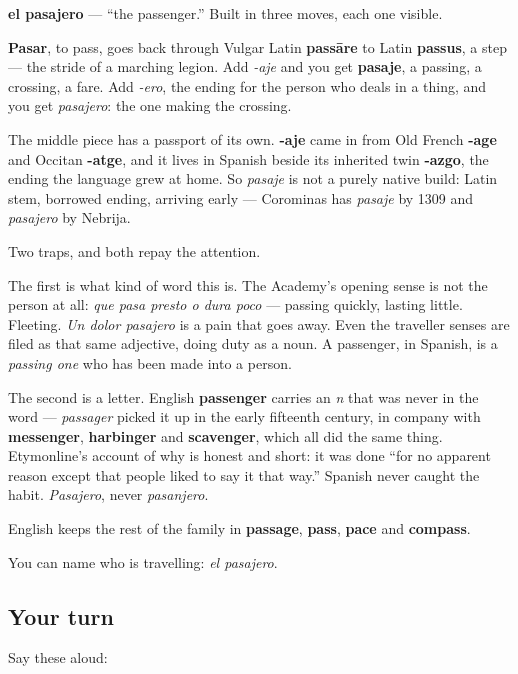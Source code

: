 \begin{cousinweb}
\textbf{el pasajero} — \textquotedblleft{}the passenger.\textquotedblright{} Built in three moves, each one visible.

\textbf{Pasar}, to pass, goes back through Vulgar Latin \textbf{passāre} to Latin \textbf{passus}, a step — the stride of a marching legion. Add \emph{-aje} and you get \textbf{pasaje}, a passing, a crossing, a fare. Add \emph{-ero}, the ending for the person who deals in a thing, and you get \emph{pasajero}: the one making the crossing.

The middle piece has a passport of its own. \textbf{-aje} came in from Old French \textbf{-age} and Occitan \textbf{-atge}, and it lives in Spanish beside its inherited twin \textbf{-azgo}, the ending the language grew at home. So \emph{pasaje} is not a purely native build: Latin stem, borrowed ending, arriving early — Corominas has \emph{pasaje} by 1309 and \emph{pasajero} by Nebrija.

Two traps, and both repay the attention.

The first is what kind of word this is. The Academy's opening sense is not the person at all: \emph{que pasa presto o dura poco} — passing quickly, lasting little. Fleeting. \emph{Un dolor pasajero} is a pain that goes away. Even the traveller senses are filed as that same adjective, doing duty as a noun. A passenger, in Spanish, is a \emph{passing one} who has been made into a person.

The second is a letter. English \textbf{passenger} carries an \emph{n} that was never in the word — \emph{passager} picked it up in the early fifteenth century, in company with \textbf{messenger}, \textbf{harbinger} and \textbf{scavenger}, which all did the same thing. Etymonline's account of why is honest and short: it was done \textquotedblleft{}for no apparent reason except that people liked to say it that way.\textquotedblright{} Spanish never caught the habit. \emph{Pasajero}, never \emph{pasanjero}.

English keeps the rest of the family in \textbf{passage}, \textbf{pass}, \textbf{pace} and \textbf{compass}.
\end{cousinweb}

\begin{grammarlens}[title={What you've built}]
You can name who is travelling: \emph{el pasajero}.
\end{grammarlens}

\subsection*{Your turn}
Say these aloud:

